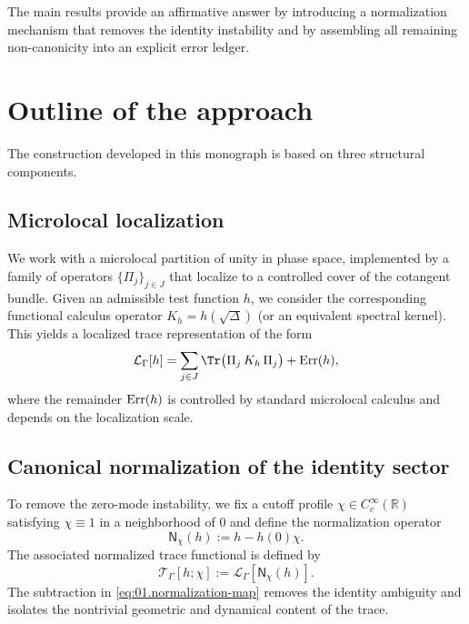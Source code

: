 The main results provide an affirmative answer by introducing a normalization mechanism that removes the identity
instability and by assembling all remaining non-canonicity into an explicit error ledger.

\section{Outline of the approach}
\label{sec:01.approach}

The construction developed in this monograph is based on three structural components.

\subsection{Microlocal localization}
\label{subsec:01.approach.localization}

We work with a microlocal partition of unity in phase space, implemented by a family of operators
$\{\Pi_j\}_{j\in J}$ that localize to a controlled cover of the cotangent bundle.
Given an admissible test function $h$, we consider the corresponding functional calculus operator $K_h=h(\sqrt{\Delta})$
(or an equivalent spectral kernel).
This yields a localized trace representation of the form
\begin{equation}
\label{eq:01.microlocal-trace}
\mathcal{L}_\Gamma[h]
=
\sum_{j\in J}\Tr\bigl(\Pi_j\,K_h\,\Pi_j\bigr)
+
\Err(h),
\end{equation}
where the remainder $\mathrm{Err}(h)$ is controlled by standard microlocal calculus and depends on the localization scale.

\subsection{Canonical normalization of the identity sector}
\label{subsec:01.approach.normalization}

To remove the zero-mode instability, we fix a cutoff profile $\chi\in C_c^\infty(\mathbb{R})$ satisfying
$\chi\equiv 1$ in a neighborhood of $0$ and define the normalization operator
\begin{equation}
\label{eq:01.normalization-map}
\mathsf{N}_\chi(h)
:=
h-h(0)\chi.
\end{equation}
The associated normalized trace functional is defined by
\begin{equation}
\label{eq:01.normalized-trace}
\mathcal{T}_\Gamma[h;\chi]
:=
\mathcal{L}_\Gamma[\mathsf{N}_\chi(h)].
\end{equation}
The subtraction in \eqref{eq:01.normalization-map} removes the identity ambiguity and isolates the nontrivial
geometric and dynamical content of the trace.

